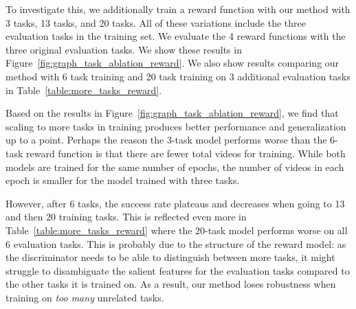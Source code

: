To investigate this, we additionally train a reward function with our method with 3 tasks, 13 tasks, and 20 tasks. All of these variations include the three evaluation tasks in the training set. We evaluate the 4 reward functions with the three original evaluation tasks. We show these results in Figure~\ref{fig:graph_task_ablation_reward}. We also show results comparing our method with 6 task training and 20 task training on 3 additional evaluation tasks in Table~\ref{table:more_tasks_reward}.

Based on the results in Figure~\ref{fig:graph_task_ablation_reward}, we find that scaling to more tasks in training produces better performance and generalization up to a point. Perhaps the reason the 3-task model performs worse than the 6-task reward function is that there are fewer total videos for training. While both models are trained for the same number of epochs, the number of videos in each epoch is smaller for the model trained with three tasks.

However, after 6 tasks, the success rate plateaus and decreases when going to 13 and then 20 training tasks. This is reflected even more in Table~\ref{table:more_tasks_reward} where the 20-task model performs worse on all 6 evaluation tasks. This is probably due to the structure of the reward model: as the discriminator needs to be able to distinguish between more tasks, it might struggle to disambiguate the salient features for the evaluation tasks compared to the other tasks it is trained on. As a result, our method loses robustness when training on \textit{too many} unrelated tasks.
